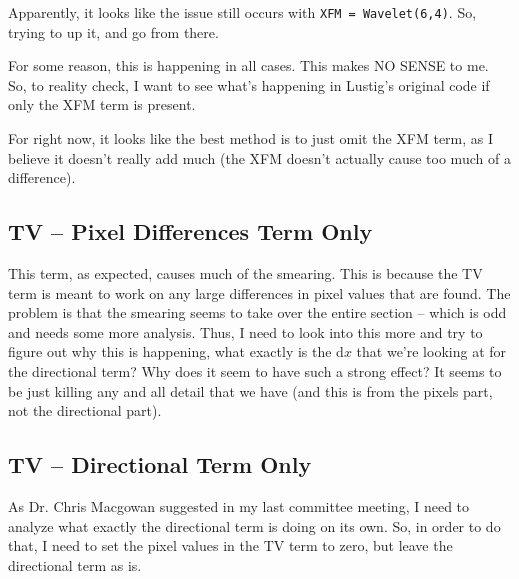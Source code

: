 \documentclass[11 pt]{article}
\begin{document}
    Apparently, it looks like the issue still occurs with \texttt{XFM = Wavelet(6,4)}. So, trying to up it, and go from there. 

    For some reason, this is happening in all cases. This makes NO SENSE to me. So, to reality check, I want to see what's happening in Lustig's original code if only the XFM term is present. 

    For right now, it looks like the best method is to just omit the XFM term, as I believe it doesn't really add much (the XFM doesn't actually cause too much of a difference).


    \subsection{TV -- Pixel Differences Term Only}

      This term, as expected, causes much of the smearing. This is because the TV term is meant to work on any large differences in pixel values that are found.  The problem is that the smearing seems to take over the entire section -- which is odd and needs some more analysis. Thus, I need to look into this more and try to figure out why this is happening, what exactly is the d$x$ that we're looking at for the directional term? Why does it seem to have such a strong effect? It seems to be just killing any and all detail that we have (and this is from the pixels part, not the directional part).

    \subsection{TV -- Directional Term Only}

      As Dr. Chris Macgowan suggested in my last committee meeting, I need to analyze what exactly the directional term is doing on its own. So, in order to do that, I need to set the pixel values in the TV term to zero, but leave the directional term as is. 
\end{document}
